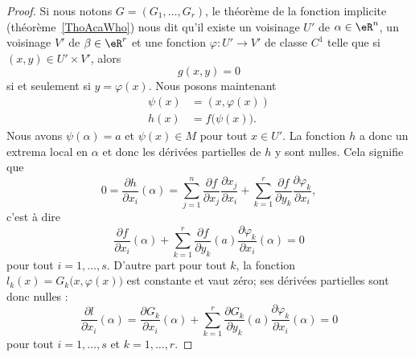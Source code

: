 \begin{proof}
    Si nous notons \( G=(G_1,\ldots, G_r)\), le théorème de la fonction implicite (théorème~\ref{ThoAcaWho})  nous dit qu'il existe un voisinage \( U'\) de \( \alpha\in \eR^n\), un voisinage \( V'\) de \( \beta\in \eR^r\) et une fonction \( \varphi\colon U'\to V'\) de classe \( C^1\) telle que si \( (x,y)\in U'\times V'\), alors
    \begin{equation}
        g(x,y)=0
    \end{equation}
    si et seulement si \( y=\varphi(x)\). Nous posons maintenant
    \begin{subequations}
        \begin{align}
            \psi(x)&=(x,\varphi(x))\\
            h(x)&=f\big( \psi(x) \big).
        \end{align}
    \end{subequations}
    Nous avons \( \psi(\alpha)=a\) et \( \psi(x)\in M\) pour tout \( x\in U'\). La fonction \( h\) a donc un extrema local en \( \alpha\) et donc les dérivées partielles de \( h\) y sont nulles. Cela signifie que
    \begin{equation}
        0=\frac{ \partial h }{ \partial x_i }(\alpha)=\sum_{j=1}^n\frac{ \partial f }{ \partial x_j }\frac{ \partial x_j }{ \partial x_i }+\sum_{k=1}^r\frac{ \partial f }{ \partial y_k }\frac{ \partial \varphi_k }{ \partial x_i },
    \end{equation}
    c'est à dire
    \begin{equation}
        \frac{ \partial f }{ \partial x_i }(\alpha)+\sum_{k=1}^r\frac{ \partial f }{ \partial y_k }(a)\frac{ \partial \varphi_k }{ \partial x_i }(\alpha)=0
    \end{equation}
    pour tout \( i=1,\ldots, s\). D'autre part pour tout $k$, la fonction \( l_k(x)=G_k\big( x,\varphi(x) \big)\) est constante et vaut zéro; ses dérivées partielles sont donc nulles :
    \begin{equation}
        \frac{ \partial l }{ \partial x_i }(\alpha)=\frac{ \partial G_k }{ \partial x_i }(\alpha)+\sum_{k=1}^r\frac{ \partial G_k }{ \partial y_k }(a)\frac{ \partial \varphi_k }{ \partial x_i }(\alpha)=0
    \end{equation}
    pour tout \( i=1,\ldots, s\) et \( k=1,\ldots, r\).


\end{proof}
